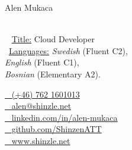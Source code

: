 \begin{minipage}[t]{0.4\textwidth}
    \vspace{0pt} %
    {\par\centering\huge{Alen Mukaca}} \\[0.3cm]

    {\small
    \faGraduationCap~ \underline{Title:} Cloud Developer \\
    \faCommentsO~\underline{Languages:} \emph{Swedish} (Fluent C2), \\ \emph{English} (Fluent C1), \\ \emph{Bosnian} (Elementary A2).}
\end{minipage}\hfill
\begin{minipage}[t]{0.55\textwidth}
    \vspace{0pt} %
    \href{tel:+46762160103}{\faPhone~ (+46) 762 1601013} \\
    \href{mailto:alen@shinzle.net}{\faEnvelopeO~ \protect alen@shinzle.net} \\[0.1cm]

    \href{https://linkedin.com/in/alen-mukaca/}{\faLinkedin~ \protect linkedin.com/in/alen-mukaca} \\
    \href{https://github.com/ShinzenATT}{\faGithub~ \protect github.com/ShinzenATT} \\
    \href{https://shinzle.net}{\faGlobe~ \protect www.shinzle.net}
\end{minipage}
